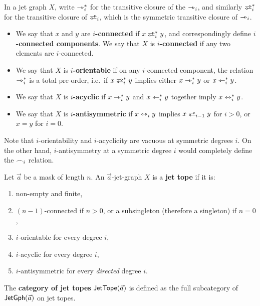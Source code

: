 \documentclass[a4paper]{memoir}
\begin{document}
\begin{definition}
	\label{def:jet-connected}
	\label{def:jet-sublinear}
	In a jet graph $X$, write $\rightarrowtriangle_i^*$ for the transitive closure of the $\rightarrowtriangle_i$, and similarly $\infrajet_i^*$ for the transitive closure of $\infrajet_i$, which is the symmetric transitive closure of $\rightarrowtriangle_i$.
	\begin{itemize}
		\item We say that $x$ and $y$ are \textbf{$i$-connected} if $x \infrajet_i^* y$, and correspondingly define \textbf{$i$-connected components}.
		We say that $X$ is \textbf{$i$-connected} if any two elements are $i$-connected.
		\item We say that $X$ is \textbf{$i$-orientable} if on any $i$-connected component, the relation ${\rightarrowtriangle}_i^*$ is a total pre-order, i.e.\ if $x \infrajet_i^* y$ implies either $x \rightarrowtriangle_i^* y$ or $x \leftarrowtriangle_i^* y$.
		\item We say that $X$ is \textbf{$i$-acyclic} if $x \rightarrowtriangle_i^* y$ and $x \leftarrowtriangle_i^* y$ together imply $x \leftrightarrowtriangle_i^* y$.
		\item We say that $X$ is \textbf{$i$-antisymmetric} if $x \leftrightarrowtriangle_i y$ implies $x \infrajet_{i-1} y$ for $i > 0$, or $x = y$ for $i = 0$.
	\end{itemize}
\end{definition}
Note that $i$-orientability and $i$-acyclicity are vacuous at symmetric degrees $i$.
On the other hand, $i$-antisymmetry at a symmetric degree $i$ would completely define the $\frown_i$ relation.
\begin{definition} \label{def:jet-tope}
	Let $\vec a$ be a mask of length $n$.
	An $\vec a$-jet-graph $X$ is a \textbf{jet tope} if it is:
	\begin{enumerate}
		\item non-empty and finite,
		\item $(n-1)$-connected if $n > 0$, or a subsingleton (therefore a singleton) if $n = 0$,
		\item $i$-orientable for every degree $i$,
		\item $i$-acyclic for every degree $i$,
		\item $i$-antisymmetric for every \emph{directed} degree $i$.
	\end{enumerate}
	The \textbf{category of jet topes} $\mathsf{JetTope}(\vec a)$ is defined as the full subcategory of $\mathsf{JetGph}(\vec a)$ on jet topes.
\end{definition}
\end{document}
